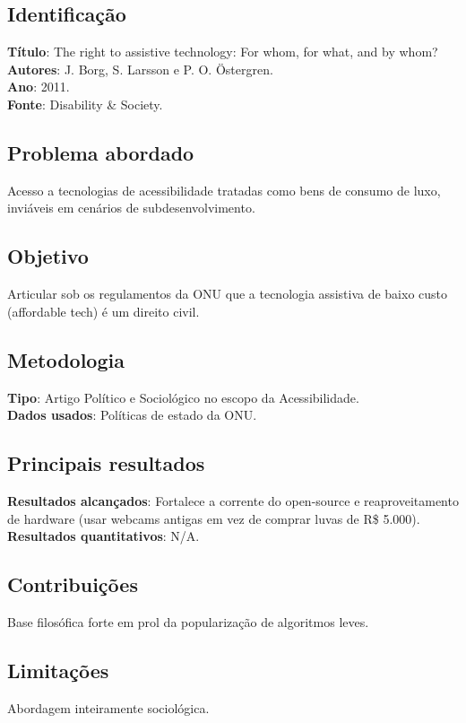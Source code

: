 \documentclass[12pt, a4paper]{article}
\begin{document}
\subsection{Identificação}
\textbf{Título}: The right to assistive technology: For whom, for what, and by whom?\\
\textbf{Autores}: J. Borg, S. Larsson e P. O. Östergren.\\
\textbf{Ano}: 2011.\\
\textbf{Fonte}: Disability \& Society.\\
\subsection{Problema abordado}
Acesso a tecnologias de acessibilidade tratadas como bens de consumo de luxo, inviáveis em cenários de subdesenvolvimento.\\
\subsection{Objetivo}
Articular sob os regulamentos da ONU que a tecnologia assistiva de baixo custo (affordable tech) é um direito civil.\\
\subsection{Metodologia}
\textbf{Tipo}: Artigo Político e Sociológico no escopo da Acessibilidade.\\
\textbf{Dados usados}: Políticas de estado da ONU.\\
\subsection{Principais resultados}
\textbf{Resultados alcançados}: Fortalece a corrente do open-source e reaproveitamento de hardware (usar webcams antigas em vez de comprar luvas de R\$ 5.000).\\
\textbf{Resultados quantitativos}: N/A.\\
\subsection{Contribuições}
Base filosófica forte em prol da popularização de algoritmos leves.\\
\subsection{Limitações}
Abordagem inteiramente sociológica.\\
\end{document}
